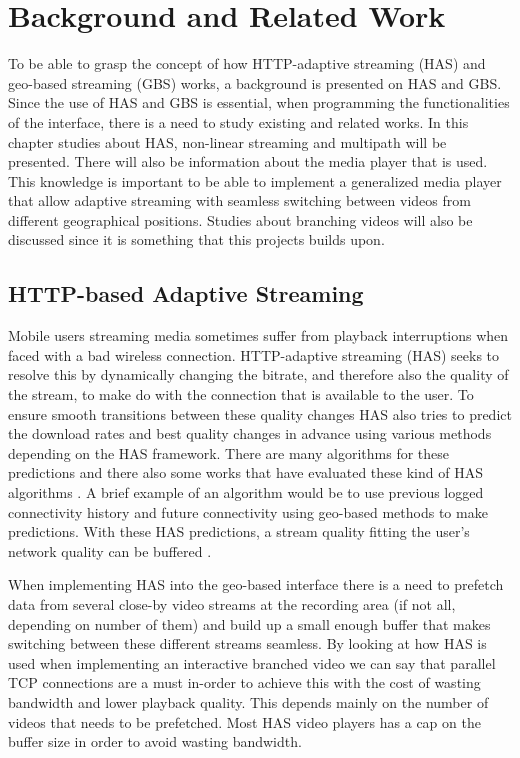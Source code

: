 \chapter{Background and Related Work}
\label{cha:theory}

To be able to grasp the concept of how HTTP-adaptive streaming (HAS) and geo-based streaming (GBS) works, a background is presented on HAS and GBS. Since the use of HAS and GBS is essential, when programming the functionalities of the interface, there is a need to study existing and related works. In this chapter studies about HAS, non-linear streaming and multipath will be presented. There will also be information about the media player that is used. This knowledge is important to be able to implement a generalized media player that allow adaptive streaming with seamless switching between videos from different geographical positions. Studies about branching videos will also be discussed since it is something that this projects builds upon.

\section{HTTP-based Adaptive Streaming}
\label{sec:has}

Mobile users streaming media sometimes suffer from playback interruptions when faced with a bad wireless connection. HTTP-adaptive streaming (HAS) seeks to resolve this by dynamically changing the bitrate, and therefore also the quality of the stream, to make do with the connection that is available to the user. To ensure smooth transitions between these quality changes HAS also tries to predict the download rates and best quality changes in advance using various methods depending on the HAS framework. There are many algorithms for these predictions and there also some works that have evaluated these kind of HAS algorithms \cite{experimentalevaluation,hastohelp}. A brief example of an algorithm would be to use previous logged connectivity history and future connectivity using geo-based methods to make predictions. With these HAS predictions, a stream quality fitting the user’s network quality can be buffered \cite{gtube}.

When implementing HAS into the geo-based interface there is a need to prefetch data from several close-by video streams at the recording area (if not all, depending on number of them) and build up a small enough buffer that makes switching between these different streams seamless. By looking at how HAS is used when implementing an interactive branched video we can say that parallel TCP connections are a must in-order to achieve this with the cost of wasting bandwidth and lower playback quality. This depends mainly on the number of videos that needs to be prefetched. Most HAS video players has a cap on the buffer size in order to avoid wasting bandwidth. 

